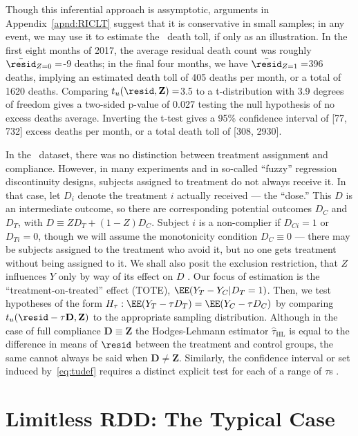 Though this inferential approach is assymptotic, arguments in
Appendix~\ref{apnd:RICLT} suggest that it is conservative in small
samples;  in any event, we may use it to estimate the \maria\ death
toll, if only as an illustration.
In the first eight months of 2017, the average residual death count
was roughly
$\bar{\resid}_{Z=0}=$-9 deaths;
in the final four months, we have
$\bar{\resid}_{Z=1}=$396
deaths, implying an estimated death toll of 405 deaths
per month, or a total of 1620 deaths.
Comparing
$t_{u}(\mathbf{\resid},\mathbf{Z})=$3.5
to a t-distribution with 3.9 degrees
of freedom gives a two-sided p-value of 0.027
testing the null hypothesis of no excess deaths
average.
Inverting the t-test gives a 95\% confidence interval of
[77, 732] excess deaths per
month, or a total death toll of
[308, 2930].

In the \maria\ dataset, there was no distinction between treatment
assignment and compliance.
However, in many experiments and in so-called ``fuzzy'' regression
discontinuity designs, subjects assigned to treatment do not always
receive it.
In that case, let $D_{i}$ denote the treatment $i$ actually
received --- the ``dose.''
This $D$ is an intermediate outcome, so there are
corresponding potential outcomes $D_{C}$ and $D_{T}$, with $D \equiv ZD_{T}
+ (1-Z)D_{C}$.
Subject $i$ is a non-complier if $D_{Ci}=1$ or $D_{Ti}=0$, though we
will assume the monotonicity condition $D_{C}\equiv 0$ --- there may be
subjects assigned to the treatment who avoid it, but no one gets
treatment without being assigned to it.
We shall also posit the exclusion restriction,
that $Z$ influences $Y$ only by way of its effect on $D$
\citep{bloom1984ans,Angrist:etal:1996,imbens:rose:2005}.
Our focus of estimation is the
 ``treatment-on-treated'' effect (TOTE), $\EE(Y_{T} - Y_{C}|
 D_{T}=1)$.
Then, we test hypotheses of the form
$H_{\tau}: \EE( Y_{T} - \tau D_{T}) =\EE (Y_{C} - \tau D_{C})$ by
comparing $t_{u}(\mathbf{\resid}-\tau\mathbf{D}, \mathbf{Z})$ to the
appropriate sampling distribution.
Although in the case of full compliance $\bm{D}\equiv\bm{Z}$ the
Hodges-Lehmann estimator
$\hat{\tau}_{\text{HL}}$ is equal to the difference in means of
$\resid$ between the treatment and control groups, the same cannot
always be said when $\bm{D}\ne \bm{Z}$.
Similarly, the
confidence interval or set induced by~\eqref{eq:tudef} requires a distinct explicit
test for each of a range of $\tau$s
\citep[Sec.~7]{imbens:rose:2005,baiocchiChengSmall2014IVtutorial}.


\section{Limitless RDD: The Typical Case} 

